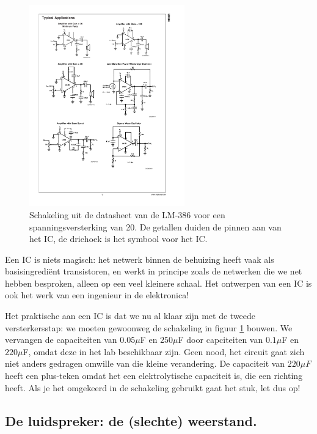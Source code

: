 \documentclass{article}
\begin{document}
			\begin{figure}[htbp]
				\centering
				\includegraphics[width=0.6\textwidth]{IC_versterker}
				\caption{Schakeling uit de datasheet van de LM-386 voor een spanningsversterking van 20. De getallen duiden de pinnen aan van het IC, de driehoek is het symbool voor het IC. }
				\label{fig:IC_versterker}
			\end{figure}

			Een IC is niets magisch: het netwerk binnen de behuizing heeft vaak als basisingredi\"ent transistoren, en werkt in principe zoals de netwerken die we net hebben besproken, alleen op een veel kleinere schaal. Het ontwerpen van een IC is ook het werk van een ingenieur in de elektronica!

			Het praktische aan een IC is dat we nu al klaar zijn met de tweede versterkersstap: we moeten gewoonweg de schakeling in figuur \ref{fig:IC_versterker} bouwen. We vervangen de capaciteiten van $0.05 \mu$F en $250\mu$F door capciteiten van $0.1\mu$F en $220\mu$F, omdat deze in het lab beschikbaar zijn. Geen nood,  het circuit gaat zich niet anders gedragen omwille van die kleine verandering. De capaciteit van $220\mu F$ heeft een plus-teken omdat het een elektrolytische capaciteit is, die een richting heeft. Als je het omgekeerd in de schakeling gebruikt gaat het stuk, let dus op!

		\subsection{De luidspreker: de (slechte) weerstand.} 
		
\end{document}
